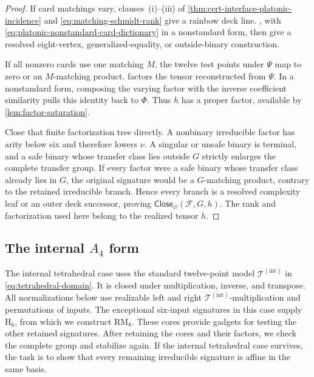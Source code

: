 \documentclass[11pt,letterpaper,onecolumn]{article}
\theoremstyle{plain}
\theoremstyle{definition}
\theoremstyle{remark}
\newcommand{\cF}{\mathcal F}
\newcommand{\TetInt}{{\mathcal T^{(\mathrm{int})}}}
\newcommand{\Close}{\mathsf{Close}}
\newcommand{\RMcore}{\mathrm{RM}_8}
\newcommand{\Hcore}{\mathrm{H}_6}
\begin{document}
\begin{proof}
If card matchings vary, clauses~\textnormal{(i)--(iii)} of
\cref{thm:cert-interface-platonic-incidence} and
\cref{eq:matching-schmidt-rank} give a rainbow deck line.
, with
\cref{eq:platonic-nonstandard-card-dictionary} in a nonstandard form,
then give a resolved eight-vertex, generalized-equality, or outside-binary
construction.

If all nonzero cards use one matching \(M\), the twelve test points under
\(\Psi\) map to zero or an \(M\)-matching product.
 factors the tensor reconstructed from
\(\Psi\). In a nonstandard form, composing the varying factor with the
inverse coefficient similarity pulls this identity back to \(\Phi\).
Thus \(h\) has a proper factor, available by \cref{lem:factor-saturation}.

Close that finite factorization tree directly.  A nonbinary irreducible factor has
arity below six and therefore lowers \(\nu\).  A singular or unsafe binary
is terminal, and a safe binary whose transfer class lies outside
\(G\) strictly enlarges the complete transfer group.  If every factor
were a safe binary whose transfer class already lies in \(G\), the original
signature would be a \(G\)-matching product, contrary
to the retained irreducible branch.  Hence every branch is a resolved complexity leaf
or an outer deck successor, proving
\(\Close_{\varnothing}(\cF,G,h)\).  The rank and factorization used here belong to the realized tensor \(h\).
\end{proof}

\subsection{The internal \texorpdfstring{\(A_4\)}{A4} form}

The internal tetrahedral case uses the standard twelve-point model
\(\TetInt\) in \cref{eq:tetrahedral-domain}.  It is closed under
multiplication, inverse, and transpose.  All normalizations below use realizable
left and right \(\TetInt\)-multiplication and permutations of inputs.
The exceptional six-input signatures in this case supply \(\Hcore\), from
which we construct \(\RMcore\). These cores provide gadgets for testing
the other retained signatures. After retaining the cores and their factors,
we check the complete group and stabilize again. If the internal
tetrahedral case survives, the task is to show that every remaining
irreducible signature is affine in the same basis.
\end{document}
